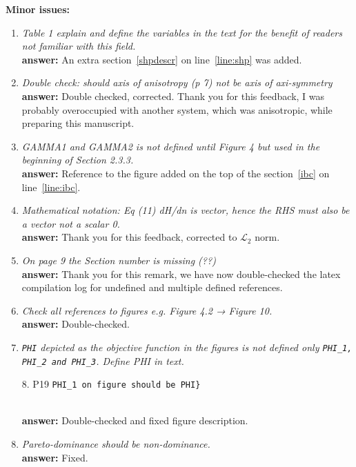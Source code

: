 \documentclass[final,3p, 11pt, a4paper]{elsarticle}
\begin{document}
{\bf Minor issues:}

\begin{enumerate}
\item {\it Table 1 explain and define the variables in the text for the benefit of readers not familiar with this field.} \\
{\bf answer:} An extra section~\ref{shpdescr} on line~\ref{line:shp} was added.
 
 \item {\it Double check: should axis of anisotropy (p 7) not be axis of axi-symmetry} \\
  {\bf answer:} Double checked, corrected. Thank you for this feedback, I was probably overoccupied with another system, which was anisotropic, while preparing this manuscript.
 
 \item {\it GAMMA1 and GAMMA2 is not defined until Figure 4 but used in the beginning of Section 2.3.3.}\\
 {\bf answer:} Reference to the figure added on the top of the section~\ref{ibc} on line~\ref{line:ibc}.
 
 \item {\it Mathematical notation: Eq (11) dH/dn is vector, hence the RHS must also be a vector not a scalar 0.} \\
 {\bf answer:} Thank you for this feedback, corrected to $\mathcal{L}_2$ norm.
 
 \item {\it  On page 9 the Section number is missing (??)}\\
 {\bf answer:}  Thank you for this remark, we have now double-checked the latex compilation log for undefined and multiple defined references.
 
 \item {\it  Check all references to figures e.g. Figure 4.2 → Figure 10.} \\
 {\bf answer:} Double-checked.
 
 \item {\it \verb(PHI( depicted as the objective function in the figures is not defined only \verb(PHI_1, PHI_2 and PHI_3(. Define PHI in text.

 8. P19 \verb(PHI_1 on figure should be PHI}( }\\
 {\bf answer:} Double-checked and fixed figure description.
 
 \item {\it  Pareto-dominance should be non-dominance.} \\ 
 {\bf answer:} Fixed.
 
 
 \end{enumerate}
\end{document}

